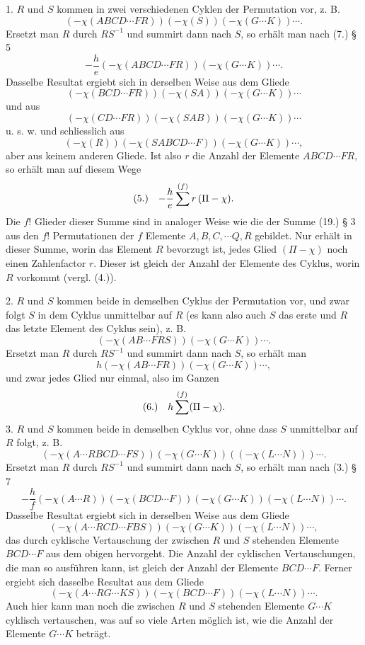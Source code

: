 \documentclass[11pt]{article}
\makeatletter
\newcommand{\frobtagc}[2]{\[\begin{array}{@{}r@{\quad}c@{}}\textup{(#1)} & \displaystyle #2\end{array}\]}
\makeatother
\begin{document}
1. $R$ und $S$ kommen in zwei verschiedenen Cyklen der Permutation vor, z. B.
\[
(-\chi(ABCD\cdots FR))(-\chi(S))(-\chi(G\cdots K))\cdots .
\]
Ersetzt man $R$ durch $RS^{-1}$ und summirt dann nach $S$, so erhält man nach (7.) § 5
\[
-\frac{h}{e}(-\chi(ABCD\cdots FR))(-\chi(G\cdots K))\cdots .
\]
Dasselbe Resultat ergiebt sich in derselben Weise aus dem Gliede
\[
(-\chi(BCD\cdots FR))(-\chi(SA))(-\chi(G\cdots K))\cdots
\]
und aus
\[
(-\chi(CD\cdots FR))(-\chi(SAB))(-\chi(G\cdots K))\cdots
\]
u. s. w. und schliesslich aus
\[
(-\chi(R))(-\chi(SABCD\cdots F))(-\chi(G\cdots K))\cdots,
\]
aber aus keinem anderen Gliede. Ist also $r$ die Anzahl der Elemente $ABCD\cdots FR$, so erhält man auf diesem Wege
\frobtagc{5.}{-\frac{h}{e}\sum^{(f)}r\,(\Pi-\chi).}
Die $f!$ Glieder dieser Summe sind in analoger Weise wie die der Summe (19.) § 3 aus den $f!$ Permutationen der $f$ Elemente $A,B,C,\cdots Q,R$ gebildet. Nur erhält in dieser Summe, worin das Element $R$ bevorzugt ist, jedes Glied $(\Pi-\chi)$ noch einen Zahlenfactor $r$. Dieser ist gleich der Anzahl der Elemente des Cyklus, worin $R$ vorkommt (vergl. (4.)).

2. $R$ und $S$ kommen beide in demselben Cyklus der Permutation vor, und zwar folgt $S$ in dem Cyklus unmittelbar auf $R$ (es kann also auch $S$ das erste und $R$ das letzte Element des Cyklus sein), z. B.
\[
(-\chi(AB\cdots FRS))(-\chi(G\cdots K))\cdots .
\]
Ersetzt man $R$ durch $RS^{-1}$ und summirt dann nach $S$, so erhält man
\[
h(-\chi(AB\cdots FR))(-\chi(G\cdots K))\cdots,
\]
und zwar jedes Glied nur einmal, also im Ganzen
\frobtagc{6.}{h\sum^{(f)}(\Pi-\chi).}
3. $R$ und $S$ kommen beide in demselben Cyklus vor, ohne dass $S$ unmittelbar auf $R$ folgt, z. B.
\[
(-\chi(A\cdots RBCD\cdots FS))(-\chi(G\cdots K))((-\chi(L\cdots N)))\cdots .
\]
Ersetzt man $R$ durch $RS^{-1}$ und summirt dann nach $S$, so erhält man nach (3.) § 7
\[
-\frac{h}{f}(-\chi(A\cdots R))(-\chi(BCD\cdots F))(-\chi(G\cdots K))(-\chi(L\cdots N))\cdots .
\]
Dasselbe Resultat ergiebt sich in derselben Weise aus dem Gliede
\[
(-\chi(A\cdots RCD\cdots FBS))(-\chi(G\cdots K))(-\chi(L\cdots N))\cdots,
\]
das durch cyklische Vertauschung der zwischen $R$ und $S$ stehenden Elemente $BCD\cdots F$ aus dem obigen hervorgeht. Die Anzahl der cyklischen Vertauschungen, die man so ausführen kann, ist gleich der Anzahl der Elemente $BCD\cdots F$. Ferner ergiebt sich dasselbe Resultat aus dem Gliede
\[
(-\chi(A\cdots RG\cdots KS))(-\chi(BCD\cdots F))(-\chi(L\cdots N))\cdots .
\]
Auch hier kann man noch die zwischen $R$ und $S$ stehenden Elemente $G\cdots K$ cyklisch vertauschen, was auf so viele Arten möglich ist, wie die Anzahl der Elemente $G\cdots K$ beträgt.
\end{document}

